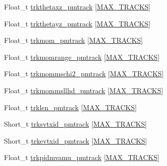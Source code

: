 \begin{DoxyCompactItemize}
\item 
Float\-\_\-t \hyperlink{classanatree_a976b72db54353c14cc663e2c23fff806}{trkthetaxz\-\_\-pmtrack} \mbox{[}\hyperlink{anatree__core__v09410002__orig_8h_a327fd4e796e4a0d78947524c96e4362e}{M\-A\-X\-\_\-\-T\-R\-A\-C\-K\-S}\mbox{]}
\item 
Float\-\_\-t \hyperlink{classanatree_ade5e722b3626309af50f9d112f0dff5c}{trkthetayz\-\_\-pmtrack} \mbox{[}\hyperlink{anatree__core__v09410002__orig_8h_a327fd4e796e4a0d78947524c96e4362e}{M\-A\-X\-\_\-\-T\-R\-A\-C\-K\-S}\mbox{]}
\item 
Float\-\_\-t \hyperlink{classanatree_aa411c306205f8e3b6663ab34685f2c38}{trkmom\-\_\-pmtrack} \mbox{[}\hyperlink{anatree__core__v09410002__orig_8h_a327fd4e796e4a0d78947524c96e4362e}{M\-A\-X\-\_\-\-T\-R\-A\-C\-K\-S}\mbox{]}
\item 
Float\-\_\-t \hyperlink{classanatree_a725421ebaec99bbeaacda2ea1df8ac54}{trkmomrange\-\_\-pmtrack} \mbox{[}\hyperlink{anatree__core__v09410002__orig_8h_a327fd4e796e4a0d78947524c96e4362e}{M\-A\-X\-\_\-\-T\-R\-A\-C\-K\-S}\mbox{]}
\item 
Float\-\_\-t \hyperlink{classanatree_ad6f4b9a484529c39f413d31fdaa51664}{trkmommschi2\-\_\-pmtrack} \mbox{[}\hyperlink{anatree__core__v09410002__orig_8h_a327fd4e796e4a0d78947524c96e4362e}{M\-A\-X\-\_\-\-T\-R\-A\-C\-K\-S}\mbox{]}
\item 
Float\-\_\-t \hyperlink{classanatree_a7c538c0f882a2b346b7af037a89b9d00}{trkmommsllhd\-\_\-pmtrack} \mbox{[}\hyperlink{anatree__core__v09410002__orig_8h_a327fd4e796e4a0d78947524c96e4362e}{M\-A\-X\-\_\-\-T\-R\-A\-C\-K\-S}\mbox{]}
\item 
Float\-\_\-t \hyperlink{classanatree_a3aaceb331268e1053c107da3dead2769}{trklen\-\_\-pmtrack} \mbox{[}\hyperlink{anatree__core__v09410002__orig_8h_a327fd4e796e4a0d78947524c96e4362e}{M\-A\-X\-\_\-\-T\-R\-A\-C\-K\-S}\mbox{]}
\item 
Short\-\_\-t \hyperlink{classanatree_a0fe8910856f14e542cf42c275b4fbb50}{trksvtxid\-\_\-pmtrack} \mbox{[}\hyperlink{anatree__core__v09410002__orig_8h_a327fd4e796e4a0d78947524c96e4362e}{M\-A\-X\-\_\-\-T\-R\-A\-C\-K\-S}\mbox{]}
\item 
Short\-\_\-t \hyperlink{classanatree_a98535a6464f1d6b57ca774be9ae120fc}{trkevtxid\-\_\-pmtrack} \mbox{[}\hyperlink{anatree__core__v09410002__orig_8h_a327fd4e796e4a0d78947524c96e4362e}{M\-A\-X\-\_\-\-T\-R\-A\-C\-K\-S}\mbox{]}
\item 
Float\-\_\-t \hyperlink{classanatree_ab5c98f63151205a8ba15f16c84ae580a}{trkpidmvamu\-\_\-pmtrack} \mbox{[}\hyperlink{anatree__core__v09410002__orig_8h_a327fd4e796e4a0d78947524c96e4362e}{M\-A\-X\-\_\-\-T\-R\-A\-C\-K\-S}\mbox{]}

\end{DoxyCompactItemize}
